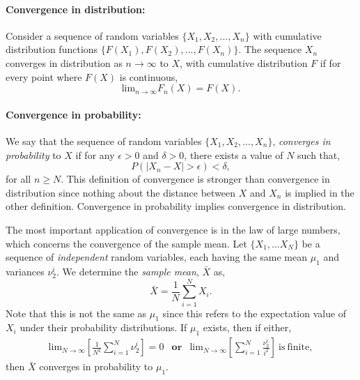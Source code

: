 \paragraph{Convergence in distribution:}
Consider a sequence of random variables $\{X_{1},X_{2},...,X_{n}\}$ with cumulative distribution functions $\{F(X_{1}),F(X_2),...,F(X_{n})\}$. The sequence $X_{n}$ converges in distribution as $n\rightarrow \infty$ to $X$, with cumulative distribution $F$ if for every point where $F(X)$ is continuous, 
\begin{equation}
    \mathrm{lim}_{n\rightarrow \infty}F_{n}(X) = F(X).
\end{equation}
\paragraph{Convergence in probability:}
We say that the sequence of random variables $\{X_{1},X_{2},...,X_{n}\}$, \emph{converges in probability} to $X$ if for any $\epsilon > 0$ and $\delta>0$, there exists a value of $N$ such that, 
\begin{equation}
    P(|X_{n}-X|>\epsilon) < \delta, 
\end{equation}
for all $n\geq N$. This definition of convergence is stronger than convergence in distribution since nothing about the distance between $X$ and $X_{n}$ is implied in the other definition. Convergence in probability implies convergence in distribution. 

The most important application of convergence is in the law of large numbers, which concerns the convergence of the sample mean. Let $\{X_{1},...X_{N}\}$ be a sequence of \emph{independent} random variables, each having the same mean $\mu_{1}$ and variances $\nu^{i}_{2}$. We determine the \emph{sample mean}, $\bar{X}$ as, 
\begin{equation}
    \bar{X} = \frac{1}{N}\sum_{i=1}^{N}X_{i}.
\end{equation}
Note that this is not the same as $\mu_{1}$ since this refers to the expectation value of $X_i$ under their probability distributions. If $\mu_{1}$ exists, then if either, 
\begin{eqnarray}
  \mathrm{lim}_{N\rightarrow \infty} \left[\frac{1}{N^{2}}\sum_{i=1}^{N}\nu^{i}_{2} \right] = 0 & \mathrm{\textbf{or}} & \mathrm{lim}_{N\rightarrow \infty}\left[\sum_{i=1}^{N}\frac{\nu^{i}_{2}}{i^{2}} \right] \mathrm{~is~finite}, 
\end{eqnarray}
then $\bar{X}$ converges in probability to $\mu_{1}$. 

